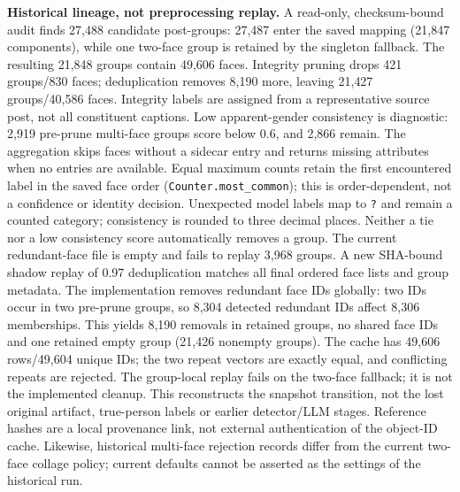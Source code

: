 \documentclass[journal]{IEEEtran}
\begin{document}
\textbf{Historical lineage, not preprocessing replay.}
A read-only, checksum-bound audit finds 27{,}488 candidate post-groups: 27{,}487 enter
the saved mapping (21{,}847 components), while one two-face group is retained by the
singleton fallback. The resulting 21{,}848 groups contain 49{,}606 faces. Integrity pruning
drops 421 groups/830 faces; deduplication removes 8{,}190 more, leaving
21{,}427 groups/40{,}586 faces. Integrity labels are assigned from a representative
source post, not all constituent captions. Low apparent-gender consistency is diagnostic:
2{,}919 pre-prune multi-face groups score below 0.6, and 2{,}866 remain.
The aggregation skips faces without a sidecar entry and returns missing attributes
when no entries are available. Equal maximum counts retain the first encountered
label in the saved face order (\texttt{Counter.most\_common}); this is order-dependent,
not a confidence or identity decision. Unexpected model labels map to \texttt{?}
and remain a counted category; consistency is rounded to three decimal places.
Neither a tie nor a low consistency score automatically removes a group.
The current redundant-face file is empty and fails to replay 3{,}968 groups.
A new SHA-bound shadow replay of 0.97 deduplication matches all final ordered face lists
and group metadata. The implementation removes redundant face IDs globally: two IDs
occur in two pre-prune groups, so 8{,}304 detected redundant IDs affect 8{,}306 memberships.
This yields 8{,}190 removals in retained groups, no shared face IDs and one retained
empty group (21{,}426 nonempty groups). The cache has 49{,}606 rows/49{,}604 unique IDs;
the two repeat vectors are exactly equal, and conflicting repeats are rejected.
The group-local replay fails on the two-face fallback; it is not the implemented cleanup.
This reconstructs the snapshot transition, not the lost original artifact, true-person
labels or earlier detector/LLM stages. Reference hashes are a local provenance link,
not external authentication of the object-ID cache.
Likewise, historical multi-face rejection records differ from the current two-face
collage policy; current defaults cannot be asserted as the settings of the historical run.
\end{document}
